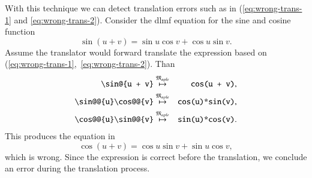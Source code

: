 With this technique we can detect translation errors such as in (\ref{eq:wrong-trans-1} and \ref{eq:wrong-trans-2}). Consider the \gls*{dlmf} equation for the sine and cosine function~\parencite[eq 4.21.2]{NIST:DLMF}
\begin{equation}
\sin \left(u+v\right) = \sin{u}\cos{v} + \cos{u}\sin{v}.
\end{equation}
Assume the translator would forward translate the expression based on (\ref{eq:wrong-trans-1},~\ref{eq:wrong-trans-2}). Than
\begin{eqnarray}
\verb|\sin@{u + v}| & \overset{\langMaple}{\mapsto} & \verb|cos(u + v)|,\\
\verb|\sin@@{u}\cos@@{v}| & \overset{\langMaple}{\mapsto} & \verb|cos(u)*sin(v)|,\\
\verb|\cos@@{u}\sin@@{v}| & \overset{\langMaple}{\mapsto} & \verb|sin(u)*cos(v)|.
\end{eqnarray}
This produces the equation in \Maple
\begin{equation}
\cos\left(u+v\right) = \cos{u}\sin{v} + \sin{u}\cos{v},
\end{equation}
which is wrong. Since the expression is correct before the translation, we conclude an error during the translation process.

